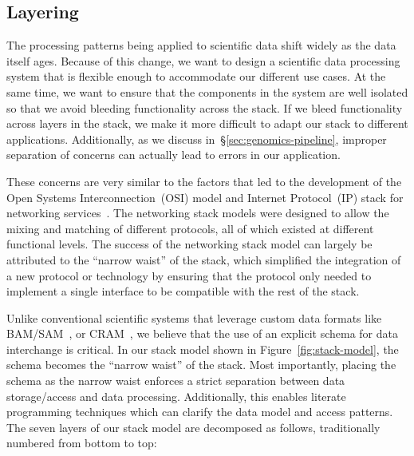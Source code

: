 \documentclass{acm_proc_article-sp}
\begin{document}
\subsection{Layering}
\label{sec:layering}

The processing patterns being applied to scientific data shift widely
as the data itself ages. Because of this change, we want to design a scientific data processing system that is
flexible enough to accommodate our different use cases. At the same time, we want to ensure that the
components in the system are well isolated so that we avoid bleeding functionality across the stack. If
we bleed functionality across layers in the stack, we make it more difficult to adapt our stack to different
applications. Additionally, as we discuss in~\S\ref{sec:genomics-pipeline}, improper separation of
concerns can actually lead to errors in our application.

These concerns are very similar to the factors that led to the development of the Open Systems
Interconnection~(OSI) model and Internet Protocol~(IP) stack for networking
services~\cite{zimmermann80}. The networking stack models were designed to allow the mixing and
matching of different protocols, all of which existed at different functional levels. The success of the
networking stack model can largely be attributed to the ``narrow waist'' of the stack, which simplified the
integration of a new protocol or technology by ensuring that the protocol only needed to implement a
single interface to be compatible with the rest of the stack.

Unlike conventional scientific systems that leverage custom data formats like BAM/SAM~\cite{li09},
or CRAM~\cite{fritz11}, we believe that the use of an explicit schema for data interchange is critical.
In our stack model shown in Figure~\ref{fig:stack-model}, the schema becomes the ``narrow waist''
of the stack. Most importantly, placing the schema as the narrow waist enforces a strict separation
between data storage/access and data processing. Additionally, this enables literate programming
techniques which can clarify the data model and access patterns. The seven layers of our stack model
are decomposed as follows, traditionally numbered from bottom to top:
\end{document}
